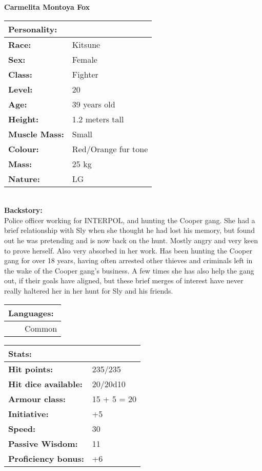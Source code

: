 \documentclass[11pt]{article}
\newcommand{\tabitem}{~~\llap{--}~~}
\begin{document}
	\begin{center}
\Huge \textbf{Carmelita Montoya Fox}
	\end{center}
	\begin{multicols}{2}
\noindent \begin{tabularx}{\linewidth}{@{}l l}
\Large \textbf{Personality:} 	& 						\\
\hline
\textbf{Race:} 					& Kitsune	 			\\
\textbf{Sex:} 					& Female 				\\
\textbf{Class:}					& Fighter				\\
\textbf{Level:} 				& 20					\\
\textbf{Age:} 					& 39 years old			\\
\textbf{Height:} 				& 1.2 meters tall 		\\
\textbf{Muscle Mass:} 			& Small 				\\
\textbf{Colour:} 				& Red/Orange fur tone 	\\
\textbf{Mass:} 					& 25 kg			 		\\
\textbf{Nature:} 				& LG
		\end{tabularx} \\
\textbf{Backstory:} \\
Police officer working for INTERPOL, and hunting the Cooper gang. She had a brief relationship with Sly when she thought he had lost his memory, but found out he was pretending and is now back on the hunt. Mostly angry and very keen to prove herself. Also very absorbed in her work. Has been hunting the Cooper gang for over 18 years, having often arrested other thieves and criminals left in the wake of the Cooper gang's business. A few times she has also help the gang out, if their goals have aligned, but these brief merges of interest have never really haltered her in her hunt for Sly and his friends.

\noindent \begin{tabularx}{\linewidth}{@{}l}
{\Large \textbf{Languages:}} \\
\hline
\tabitem Common
		\end{tabularx}

\vspace{4mm}

\noindent \begin{tabularx}{\linewidth}{@{}l l}
\Large \textbf{Stats:}		 	& 									\\
\hline
\textbf{Hit points:} 			& 235/235				 			\\
\textbf{Hit dice available:}	& 20/20d10							\\
\textbf{Armour class:} 			& 15 + 5 = 20					 	\\
\textbf{Initiative:} 			& +5								\\
\textbf{Speed:} 				& 30		 						\\
\textbf{Passive Wisdom:} 		& 11			 					\\
\textbf{Proficiency bonus:}		& +6								
		\end{tabularx}


\end{multicols}
\end{document}
